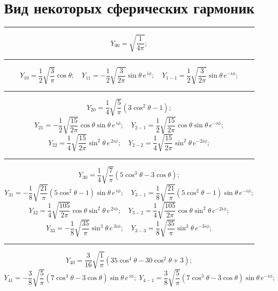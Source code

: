 \setmainfont{Noto Serif}
\setsansfont{Noto Sans}
\setmonofont{Noto Sans Mono}

\section{Вид некоторых сферических гармоник}
\rule{\textwidth}{0.4pt}
\[ \textit{Y}_{00}=\sqrt{\frac{1}{4\pi}};\]
\rule{\textwidth}{0.4pt}
\[\textit{Y}_{10}=\frac{1}{2}\sqrt{\frac{3}{\pi}}\cos {\theta}; \quad \textit{Y}_{11}=-\frac{1}{2}\sqrt{\frac{3}{2\pi}}\sin{\theta} \, e^{\,i\phi};\quad \textit{Y}_{1-1}=\frac{1}{2}\sqrt{\frac{3}{2\pi}}\sin{\theta} \, e^{-i\phi}; \]
\rule{\textwidth}{0.4pt}
\[ \textit{Y}_{20}=\frac{1}{4}\sqrt{\frac{5}{\pi}}\left( 3 \cos^2{\theta}-1 \right);\]
\[\textit{Y}_{21}=-\frac{1}{2}\sqrt{\frac{15}{2\pi}}\cos{\theta} \sin{\theta}\, e^{\,i\phi};\quad \textit{Y}_{2-1}=\frac{1}{2}\sqrt{\frac{15}{2\pi}}\cos{\theta} \sin{\theta}\, e^{-i\phi};
\]\hspace{\parindent}
\[ \textit{Y}_{22}=\frac{1}{4}\sqrt{\frac{15}{2\pi}} \sin^2 {\theta} \, e^{\,2i\phi}; \quad
\textit{Y}_{2-2}=\frac{1}{4}\sqrt{\frac{15}{2\pi}} \sin^2 {\theta} \, e^{-2i\phi};
\]
\rule{\textwidth}{0.4pt}
\[ \textit{Y}_{30}=\frac{1}{4}\sqrt{\frac{7}{\pi}}\left(5 \cos^3{\theta}-3\cos{\theta} \right);\]
\[\textit{Y}_{31}=-\frac{1}{8}\sqrt{\frac{21}{\pi}}\left(5\cos^2{\theta}-1 \right)\sin{\theta}\, e^{\,i\phi};\quad \textit{Y}_{3-1}=\frac{1}{8}\sqrt{\frac{21}{\pi}}\left( 5\cos^2{\theta}-1 \right)\sin{\theta}\, e^{-i\phi};
\]\hspace{\parindent}
\[\textit{Y}_{32}=\frac{1}{4}\sqrt{\frac{105}{2\pi}}\cos{\theta} \sin^2{\theta}\, e^{\,2i\phi};\quad \textit{Y}_{3-2}=\frac{1}{4}\sqrt{\frac{105}{2\pi}}\cos{\theta} \sin^2{\theta}\, e^{-2i\phi};
\]\hspace{\parindent}
\[ \textit{Y}_{33}=-\frac{1}{8}\sqrt{\frac{35}{\pi}} \sin^3 {\theta} \, e^{\,3i\phi}; \quad
\textit{Y}_{3-3}=\frac{1}{8}\sqrt{\frac{35}{\pi}} \sin^3 {\theta} \, e^{-3i\phi};
\]
\rule{\textwidth}{0.4pt}
\[ \textit{Y}_{40}=\frac{3}{16}\sqrt{\frac{1}{\pi}}\left(35 \cos^4{\theta}-30\cos^2{\theta}+3 \right);\]
\[\textit{Y}_{41}=-\frac{3}{8}\sqrt{\frac{5}{\pi}} \left(7\cos^3{\theta}-3\cos{\theta}\right)\sin{\theta}\, e^{\,i\phi};\; \textit{Y}_{4-1}=\frac{3}{8}\sqrt{\frac{5}{\pi}}\left(7\cos^3{\theta}-3\cos{\theta}\right)\sin{\theta}\, e^{-i\phi};
\]\hspace{\parindent}
